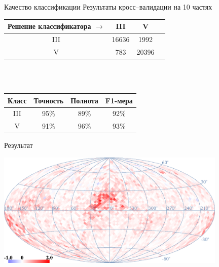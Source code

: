 \documentclass[14pt, fleqn, xcolor={dvipsnames, table}]{beamer}
\begin{document}
        \begin{frame}{Качество классификации}
            Результаты кросс--валидации на 10 частях
            \begin{center}
            \begin{tabular} {| c | c | c | c |}
                \hline
                Решение классификатора $\rightarrow$   &    III   &    V    \\
                \hline
                III    &    16636    &    1992    \\
                \hline
                V       &    783    &    20396    \\
                \hline
            \end{tabular}
            
            ~\\~\\
            
            \begin{tabular} {| c | c | c | c |}
                \hline
                Класс    &    Точность   &    Полнота    &    F1-мера     \\
                \hline
                III      &    95\%   &   89\%    &    92\%     \\
                \hline
                V        &    91\%   &    96\%    &    93\%        \\
                \hline
            \end{tabular}
            \end{center}
        \end{frame}                  
        
        \begin{frame}{Результат}
            \begin{center}
                \includegraphics[width=11cm]{map-k.eps}
            \end{center}             
        \end{frame}
        
\end{document}
